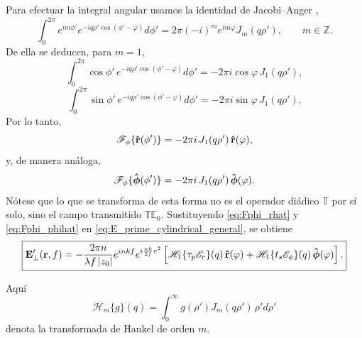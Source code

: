 Para efectuar la integral angular usamos la identidad de Jacobi--Anger \cite{Watson1944},
\begin{equation}
  \int_0^{2\pi}
  e^{im\phi'}
  e^{-iq\rho'\cos(\phi'-\varphi)}
  d\phi'
  =
  2\pi(-i)^m e^{im\varphi}J_m(q\rho'),
  \qquad m\in\mathbb Z.
  \label{eq:jacobi_anger_cylindrical}
\end{equation}
De ella se deducen, para $m=1$,
\begin{equation}
  \int_0^{2\pi}
  \cos\phi'\,
  e^{-iq\rho'\cos(\phi'-\varphi)}
  d\phi'
  =
  -2\pi i\cos\varphi\,J_1(q\rho'),
\end{equation}
\begin{equation}
  \int_0^{2\pi}
  \sin\phi'\,
  e^{-iq\rho'\cos(\phi'-\varphi)}
  d\phi'
  =
  -2\pi i\sin\varphi\,J_1(q\rho').
\end{equation}
Por lo tanto,
\begin{equation}
  \mathscr F_\phi\{\bm{\hat{\mathbf{r}}}(\phi')\}
  =
  -2\pi i\,J_1(q\rho')\,\bm{\hat{\mathbf{r}}}(\varphi),
  \label{eq:Fphi_rhat}
\end{equation}
y, de manera análoga,
\begin{equation}
  \mathscr F_\phi\{\bm{\hat{\mathbf{\phi}}}(\phi')\}
  =
  -2\pi i\,J_1(q\rho')\,\bm{\hat{\mathbf{\phi}}}(\varphi).
  \label{eq:Fphi_phihat}
\end{equation}
Nótese que lo que se transforma de esta forma no es el operador diádico $\mathbb T$ por sí solo, sino el campo transmitido $\mathbb T\mathbb E_0$. Sustituyendo \eqref{eq:Fphi_rhat} y \eqref{eq:Fphi_phihat} en \eqref{eq:E_prime_cylindrical_general}, se obtiene
\begin{equation}
\boxed{
  \vb E'_\perp(\vb r,f)
  =
  -\frac{2\pi n}{\lambda f\,|z_0|}
  e^{inkf}
  e^{i\frac{nk}{2f}r^2}
  \left[
    \mathscr H_1\{\tau_p\mathscr E_r\}(q)\,\bm{\hat{\mathbf{r}}}(\varphi)
    +
    \mathscr H_1\{t_s\mathscr E_\phi\}(q)\,\bm{\hat{\mathbf{\phi}}}(\varphi)
  \right].
}
\label{eq:E_field_cylindrical_Hankel}
\end{equation}

Aquí
\begin{equation}
  \mathscr H_m\{g\}(q)
  =
  \int_0^\infty
  g(\rho')J_m(q\rho')\,\rho' d\rho'
  \label{eq:Hankel_definition_cylindrical}
\end{equation}
denota la transformada de Hankel de orden $m$.

